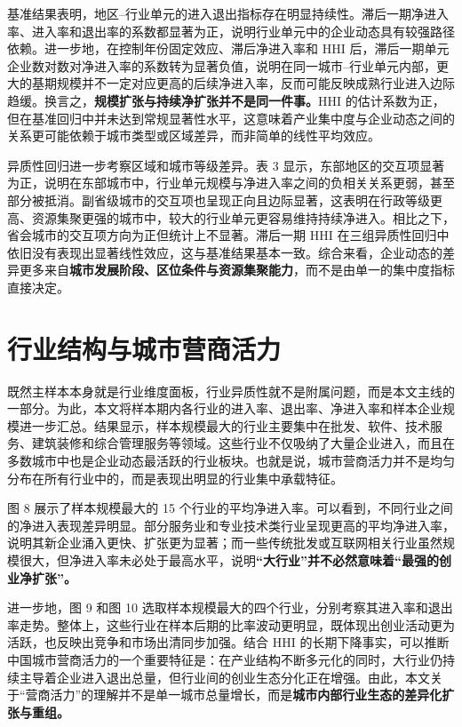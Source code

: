 \documentclass[12pt]{article}
\begin{document}
基准结果表明，地区--行业单元的进入退出指标存在明显持续性。滞后一期净进入率、进入率和退出率的系数都显著为正，说明行业单元中的企业动态具有较强路径依赖。进一步地，在控制年份固定效应、滞后净进入率和 HHI 后，滞后一期单元企业数对数对净进入率的系数转为显著负值，说明在同一城市--行业单元内部，更大的基期规模并不一定对应更高的后续净进入率，反而可能反映成熟行业进入边际趋缓。换言之，\textbf{规模扩张与持续净扩张并不是同一件事。}HHI 的估计系数为正，但在基准回归中并未达到常规显著性水平，这意味着产业集中度与企业动态之间的关系更可能依赖于城市类型或区域差异，而非简单的线性平均效应。

异质性回归进一步考察区域和城市等级差异。表 3 显示，东部地区的交互项显著为正，说明在东部城市中，行业单元规模与净进入率之间的负相关关系更弱，甚至部分被抵消。副省级城市的交互项也呈现正向且边际显著，这表明在行政等级更高、资源集聚更强的城市中，较大的行业单元更容易维持持续净进入。相比之下，省会城市的交互项方向为正但统计上不显著。滞后一期 HHI 在三组异质性回归中依旧没有表现出显著线性效应，这与基准结果基本一致。综合来看，企业动态的差异更多来自\textbf{城市发展阶段、区位条件与资源集聚能力}，而不是由单一的集中度指标直接决定。



\section{行业结构与城市营商活力}
既然主样本本身就是行业维度面板，行业异质性就不是附属问题，而是本文主线的一部分。为此，本文将样本期内各行业的进入率、退出率、净进入率和样本企业规模进一步汇总。结果显示，样本规模最大的行业主要集中在批发、软件、技术服务、建筑装修和综合管理服务等领域。这些行业不仅吸纳了大量企业进入，而且在多数城市中也是企业动态最活跃的行业板块。也就是说，城市营商活力并不是均匀分布在所有行业中的，而是表现出明显的行业集中承载特征。

图 8 展示了样本规模最大的 15 个行业的平均净进入率。可以看到，不同行业之间的净进入表现差异明显。部分服务业和专业技术类行业呈现更高的平均净进入率，说明其新企业涌入更快、扩张更为显著；而一些传统批发或互联网相关行业虽然规模很大，但净进入率未必处于最高水平，说明\textbf{“大行业”并不必然意味着“最强的创业净扩张”。}

进一步地，图 9 和图 10 选取样本规模最大的四个行业，分别考察其进入率和退出率走势。整体上，这些行业在样本后期的比率波动更明显，既体现出创业活动更为活跃，也反映出竞争和市场出清同步加强。结合 HHI 的长期下降事实，可以推断中国城市营商活力的一个重要特征是：在产业结构不断多元化的同时，大行业仍持续主导着企业进入退出总量，但行业间的创业生态分化正在增强。由此，本文关于“营商活力”的理解并不是单一城市总量增长，而是\textbf{城市内部行业生态的差异化扩张与重组。}
\end{document}
